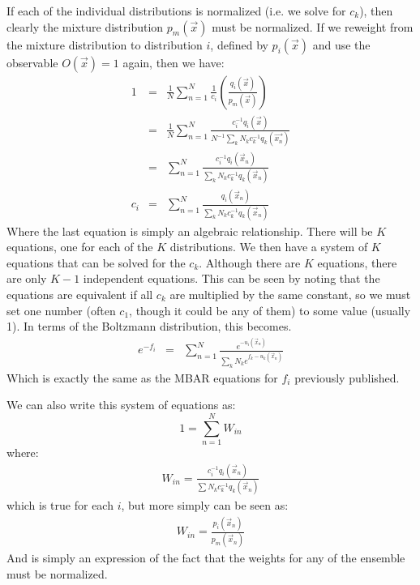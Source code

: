 \documentclass[aps,pre,twocolumn,superscriptaddress]{revtex4-1}
\begin{document}
If each of the individual distributions is normalized (i.e. we solve
for $c_k$), then clearly the mixture distribution $p_m(\vec{x})$ must
be normalized.  If we reweight from the mixture distribution to
distribution $i$, defined by $p_i(\vec{x})$ and use the observable
$O(\vec{x}) = 1$ again, then we have:
\begin{eqnarray} 
  1  &=& \frac{1}{N} \sum_{n=1}^{N}\frac{1}{c_i} \left(\frac{q_i(\vec{x})}{p_m(\vec{x})}\right) \nonumber \\
     &=& \frac{1}{N} \sum_{n=1}^N\frac{c_i^{-1} q_i(\vec{x})}{N^{-1}\sum_k N_k c_k^{-1} q_k(\vec{x_n})} \nonumber \\
     &=& \sum_{n=1}^N \frac{c_i^{-1} q_i(\vec{x}_n)}{\sum_k N_k c_k^{-1} q_k(\vec{x}_n)} \nonumber\\
c_i  &=& \sum_{n=1}^N \frac{q_i(\vec{x}_n)}{\sum_k N_k c_k^{-1} q_k(\vec{x}_n)}
\end{eqnarray}
Where the last equation is simply an algebraic relationship.  There
will be $K$ equations, one for each of the $K$
distributions.  We then have a system of $K$ equations that can be
solved for the $c_k$.  Although there are $K$ equations, there are
only $K-1$ independent equations. This can be seen by noting that the
equations are equivalent if all $c_k$ are multiplied by the same
constant, so we must set one number (often $c_1$, though it could be
any of them) to some value (usually 1). In terms of the Boltzmann
distribution, this becomes.
\begin{eqnarray*}
e^{-f_i}  &=& \sum_{n=1}^N \frac{e^{-u_i(\vec{x}_n)}}{\sum_k N_k e^{f_k - u_k(\vec{x}_n)}}
\end{eqnarray*}
Which is exactly the same as the MBAR equations for $f_i$ previously
published.

We can also write this system of equations as:
\begin{equation*}
1 = \sum_{n=1}^N W_{in}
\end{equation*} 
where: 
\begin{eqnarray*}
W_{in} = \frac{c_i^{-1} q_i(\vec{x}_n)}{\sum N_k c_k^{-1} q_k(\vec{x}_n)} 
\end{eqnarray*}
which is true for each $i$, but more simply can be seen as:
\begin{eqnarray}
W_{in} = \frac{p_i(\vec{x}_n)}{p_m(\vec{x}_n)}
\end{eqnarray}
And is simply an expression of the fact that the weights for any of
the ensemble must be normalized.
\end{document}

